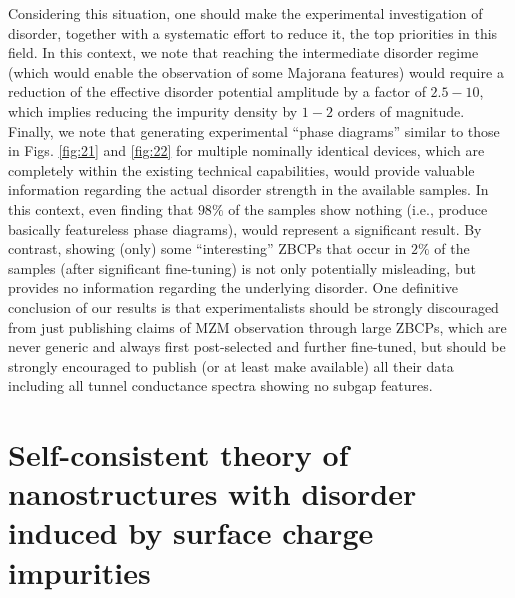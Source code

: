 \documentclass[aps,prmaterials,twocolumn,superscriptaddress,longbibliography]{revtex4-2}
\begin{document}
Considering this situation, one should make the experimental investigation of disorder, together with a systematic effort to reduce it, the top priorities in this field. In this context, we note that reaching the intermediate disorder regime (which would enable the observation of some Majorana features) would require a reduction of the effective disorder potential amplitude by a factor of $2.5-10$, which implies reducing the impurity density by $1-2$ orders of magnitude. Finally, we note that generating experimental ``phase diagrams'' similar to those in Figs. \ref{fig:21} and \ref{fig:22} for multiple nominally identical devices, which are completely within the existing technical capabilities, would provide valuable information regarding the actual disorder strength in the available samples. In this context, even finding that $98\%$ of the samples show nothing (i.e., produce basically featureless phase diagrams), would represent a significant result. By contrast, showing (only) some ``interesting'' ZBCPs that occur in $2\%$ of the samples (after significant fine-tuning) is not only potentially misleading, but provides no information regarding the underlying disorder. One definitive conclusion of our results is that experimentalists should be strongly discouraged from just publishing claims of MZM observation through large ZBCPs, which are never generic and always first post-selected and further fine-tuned, but should be strongly encouraged to publish (or at least make available) all their data including all tunnel conductance spectra showing no subgap features.


\section{Self-consistent theory of nanostructures with disorder induced by surface charge impurities} \label{SCD}
\end{document}
